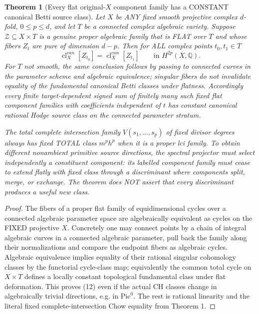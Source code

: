\documentclass[11pt]{article}
\newtheorem{theorem}{Theorem}
\begin{document}
\begin{theorem}[Every flat original-$X$ component family has a CONSTANT canonical Betti source class]
Let $X$ be ANY fixed smooth projective complex
$d$-fold, $0\le p\le d$, and let
$T$ be a connected complex algebraic variety.
Suppose $\mathcal Z\subseteq X\times T$
is a genuine proper algebraic family
that is FLAT over $T$ and whose
fibers $Z_t$ are pure of dimension $d-p$.
Then for ALL complex points $t_0,t_1\in T$
\[
\boxed{
  \operatorname{cl}^{can}_X[Z_{t_0}]
   =\operatorname{cl}^{can}_X[Z_{t_1}]
   \qquad\text{in }H^{2p}(X,\mathbb Q).
}                                                        \tag{12}
\]
For $T$ not smooth, the same conclusion follows
by passing to connected curves in the parameter
scheme and algebraic equivalence; singular fibers
do not invalidate equality of the fundamental
canonical Betti classes under flatness.
Accordingly every finite target-dependent
signed sum of finitely many such fixed flat
component families with coefficients independent
of $t$ has constant canonical rational Hodge
source class on the connected parameter
stratum.

The total complete intersection family
$V(s_1,\ldots,s_p)$ of fixed divisor degrees
always has fixed TOTAL class $m^p h^p$
when it is a proper lci family.
To obtain different nonambient primitive
source directions, the spectral projector
must select independently a constituent
component: its labelled component family
must cease to extend flatly with fixed
class through a discriminant where
components split, merge, or exchange.
The theorem does NOT assert that every
discriminant produces a useful new class.
\end{theorem}
\begin{proof}
The fibers of a proper flat family of
equidimensional cycles over a connected
algebraic parameter space are algebraically
equivalent as cycles on the FIXED
projective $X$. Concretely one may
connect points by a chain of integral
algebraic curves in a connected algebraic
parameter, pull back the family along
their normalizations and compare the
endpoint fibers as algebraic cycles.
Algebraic equivalence implies equality
of their rational singular cohomology
classes by the functorial cycle-class
map; equivalently the common total
cycle on $X\times T$ defines a locally
constant topological fundamental class
under flat deformation. This proves
(12) even if the actual CH classes
change in algebraically trivial
directions, e.g. in $\mathrm{Pic}^0$.
The rest is rational linearity and
the literal fixed complete-intersection
Chow equality from Theorem 1.
\end{proof}
\end{document}
